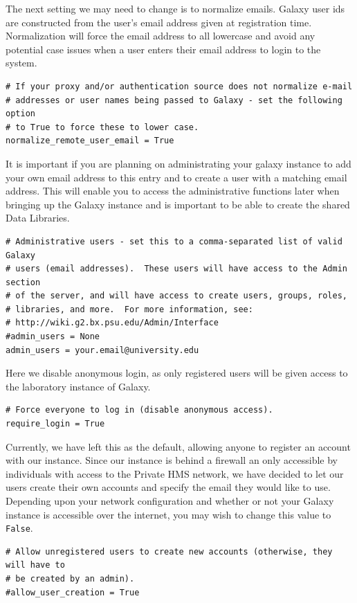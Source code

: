 \documentclass[a4paper,10pt]{article}
\begin{document}
The next setting we may need to change is to normalize emails.  Galaxy user ids are constructed from the user's email address given at registration time.  Normalization will force the email address to all lowercase and avoid any potential case issues when a user enters their email address to login to the system.

\begin{lstlisting}
# If your proxy and/or authentication source does not normalize e-mail
# addresses or user names being passed to Galaxy - set the following option
# to True to force these to lower case.
normalize_remote_user_email = True
\end{lstlisting}

It is important if you are planning on administrating your galaxy instance to add your own email address to this entry and to create a user with a matching email address.  This will enable you to access the administrative functions later when bringing up the Galaxy instance and is important to be able to create the shared Data Libraries.
\begin{lstlisting}
# Administrative users - set this to a comma-separated list of valid Galaxy
# users (email addresses).  These users will have access to the Admin section
# of the server, and will have access to create users, groups, roles,
# libraries, and more.  For more information, see:
# http://wiki.g2.bx.psu.edu/Admin/Interface
#admin_users = None
admin_users = your.email@university.edu
\end{lstlisting}

Here we disable anonymous login, as only registered users will be given access to the laboratory instance of Galaxy.
\begin{lstlisting}
# Force everyone to log in (disable anonymous access).
require_login = True
\end{lstlisting}

Currently, we have left this as the default, allowing anyone to register an account with our instance.  Since our instance is behind a firewall an only accessible by individuals with access to the Private HMS network, we have decided to let our users create their own accounts and specify the email they would like to use.  Depending upon your network configuration and whether or not your Galaxy instance is accessible over the internet, you may wish to change this value to \texttt{False}.
\begin{lstlisting}
# Allow unregistered users to create new accounts (otherwise, they will have to
# be created by an admin).
#allow_user_creation = True
\end{lstlisting}
\end{document}
